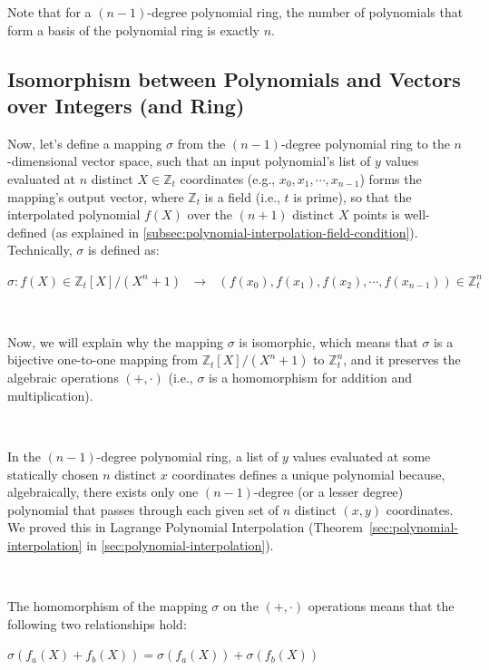 Note that for a $(n-1)$-degree polynomial ring, the number of polynomials that form a basis of the polynomial ring is exactly $n$.


\subsection{Isomorphism between Polynomials and Vectors over Integers (and Ring)}
\label{subsec:poly-vector-transformation}



Now, let's define a mapping $\sigma$ from the $(n-1)$-degree polynomial ring to the $n$-dimensional vector space, such that an input polynomial's list of $y$ values evaluated at $n$ distinct $X \in \mathbb{Z}_t$ coordinates (e.g., $x_0, x_1, \cdots, x_{n-1}$) forms the mapping's output vector, where $\mathbb{Z}_t$ is a field (i.e., $t$ is prime), so that the interpolated polynomial $f(X)$ over the $(n+1)$ distinct $X$ points is well-defined (as explained in \autoref{subsec:polynomial-interpolation-field-condition}). Technically, $\sigma$ is defined as:

$\sigma: f(X) \in \mathbb{Z}_t[X] / (X^n + 1) \text{ } \longrightarrow \text{ } (f(x_0), f(x_1), f(x_2), \cdots, f(x_{n-1})) \in \mathbb{Z}^n_t$

$ $

Now, we will explain why the mapping $\sigma$ is isomorphic, which means that $\sigma$ is a bijective one-to-one mapping from $\mathbb{Z}_t[X] / (X^n + 1)$ to $\mathbb{Z}^n_t$, and it preserves the algebraic operations $(+, \cdot)$ (i.e., $\sigma$ is a homomorphism for addition and multiplication).

$ $

 In the $(n-1)$-degree polynomial ring, a list of $y$ values evaluated at some statically chosen $n$ distinct $x$ coordinates defines a unique polynomial because, algebraically, there exists only one $(n-1)$-degree (or a lesser degree) polynomial that passes through each given set of $n$ distinct $(x, y)$ coordinates. We proved this in Lagrange Polynomial Interpolation (Theorem~\ref*{sec:polynomial-interpolation} in \autoref{sec:polynomial-interpolation}). 

$ $

 The homomorphism of the mapping $\sigma$ on the $(+, \cdot)$ operations means that the following two relationships hold: 

$\sigma(f_a(X) + f_b(X)) = \sigma(f_a(X)) + \sigma(f_b(X))$

